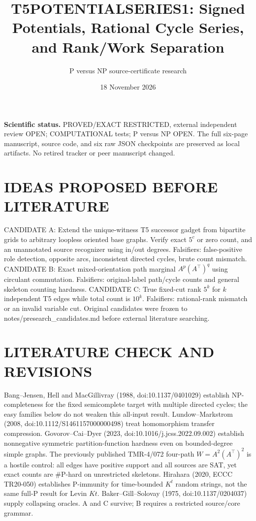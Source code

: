 \documentclass[11pt]{article}
\title{T5POTENTIALSERIES1: Signed Potentials, Rational Cycle Series, and Rank/Work Separation}
\author{P versus NP source-certificate research}
\date{18 November 2026}
\begin{document}
\maketitle
\noindent\textbf{Scientific status.} PROVED/EXACT RESTRICTED, external independent review OPEN; COMPUTATIONAL tests; P versus NP OPEN. The full six-page manuscript, source code, and six raw JSON checkpoints are preserved as local artifacts. No retired tracker or peer manuscript changed.
\section{IDEAS PROPOSED BEFORE LITERATURE}
CANDIDATE A: Extend the unique-witness T5 successor gadget from bipartite grids to arbitrary loopless oriented base graphs. Verify exact $5^c$ or zero count, and an unannotated source recognizer using in/out degrees. Falsifiers: false-positive role detection, opposite arcs, inconsistent directed cycles, brute count mismatch.
CANDIDATE B: Exact mixed-orientation path marginal $A^p(A^\top)^q$ using circulant commutation. Falsifiers: original-label path/cycle counts and general skeleton counting hardness.
CANDIDATE C: True fixed-cut rank $5^k$ for $k$ independent T5 edges while total count is $10^k$. Falsifiers: rational-rank mismatch or an invalid variable cut. Original candidates were frozen to notes/presearch_candidates.md before external literature searching.
\section{LITERATURE CHECK AND REVISIONS}
Bang--Jensen, Hell and MacGillivray (1988, doi:10.1137/0401029) establish NP-completeness for the fixed semicomplete target with multiple directed cycles; the easy families below do not weaken this all-input result. Lundow--Markstrom (2008, doi:10.1112/S1461157000000498) treat homomorphism transfer compression. Govorov--Cai--Dyer (2023, doi:10.1016/j.jcss.2022.09.002) establish nonnegative symmetric partition-function hardness even on bounded-degree simple graphs. The previously published TMR-4/072 four-path $W=A^2(A^\top)^2$ is a hostile control: all edges have positive support and all sources are SAT, yet exact counts are \#P-hard on unrestricted skeletons. Hirahara (2020, ECCC TR20-050) establishes P-immunity for time-bounded $K^t$ random strings, not the same full-P result for Levin $Kt$. Baker--Gill--Solovay (1975, doi:10.1137/0204037) supply collapsing oracles. A and C survive; B requires a restricted source/core grammar.
\end{document}
